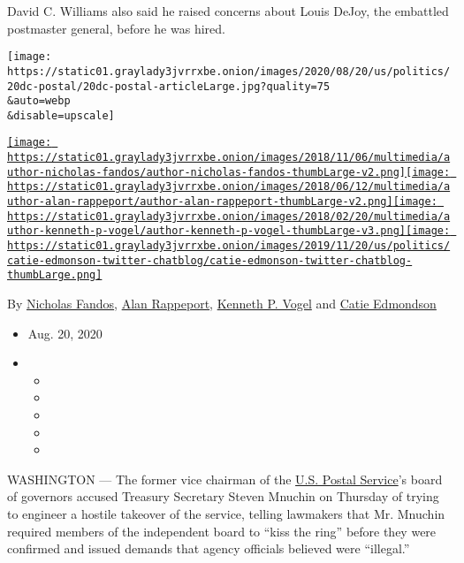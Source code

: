 David C. Williams also said he raised concerns about Louis DeJoy, the
embattled postmaster general, before he was hired.

\texttt{[image: https://static01.graylady3jvrrxbe.onion/images/2020/08/20/us/politics/20dc-postal/20dc-postal-articleLarge.jpg?quality=75\\\&auto=webp\\\&disable=upscale]}

\href{https://www.nytimes3xbfgragh.onion/by/nicholas-fandos}{\texttt{[image: https://static01.graylady3jvrrxbe.onion/images/2018/11/06/multimedia/author-nicholas-fandos/author-nicholas-fandos-thumbLarge-v2.png]}}\href{https://www.nytimes3xbfgragh.onion/by/alan-rappeport}{\texttt{[image: https://static01.graylady3jvrrxbe.onion/images/2018/06/12/multimedia/author-alan-rappeport/author-alan-rappeport-thumbLarge-v2.png]}}\href{https://www.nytimes3xbfgragh.onion/by/kenneth-p-vogel}{\texttt{[image: https://static01.graylady3jvrrxbe.onion/images/2018/02/20/multimedia/author-kenneth-p-vogel/author-kenneth-p-vogel-thumbLarge-v3.png]}}\href{https://www.nytimes3xbfgragh.onion/by/catie-edmondson}{\texttt{[image: https://static01.graylady3jvrrxbe.onion/images/2019/11/20/us/politics/catie-edmonson-twitter-chatblog/catie-edmonson-twitter-chatblog-thumbLarge.png]}}

By \href{https://www.nytimes3xbfgragh.onion/by/nicholas-fandos}{Nicholas
Fandos},
\href{https://www.nytimes3xbfgragh.onion/by/alan-rappeport}{Alan
Rappeport},
\href{https://www.nytimes3xbfgragh.onion/by/kenneth-p-vogel}{Kenneth P.
Vogel} and
\href{https://www.nytimes3xbfgragh.onion/by/catie-edmondson}{Catie
Edmondson}

\begin{itemize}
\item
  Aug. 20, 2020
\item
  \begin{itemize}
  \item
  \item
  \item
  \item
  \item
  \end{itemize}
\end{itemize}

WASHINGTON --- The former vice chairman of the
\href{https://www.nytimes3xbfgragh.onion/2020/08/24/us/politics/postal-service-dejoy-testimony.html}{U.S.
Postal Service}'s board of governors accused Treasury Secretary Steven
Mnuchin on Thursday of trying to engineer a hostile takeover of the
service, telling lawmakers that Mr. Mnuchin required members of the
independent board to ``kiss the ring'' before they were confirmed and
issued demands that agency officials believed were ``illegal.''

